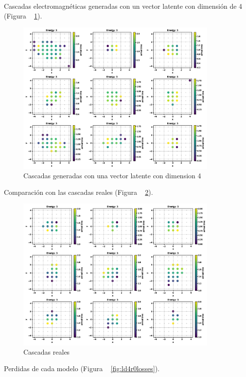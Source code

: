 Cascadas electromagnéticas generadas con un vector latente con dimensión de 4  (Figura ~ \ref{fig:ld4r0fakeshower}).

\begin{figure}
    \centering
    \includegraphics[width=100mm,scale=0.5]{Figures/res/CWGANGP_LD4_R4/fakestep4.png}
    \decoRule
    \caption[Cascadas generadas 1]{
        Cascadas generadas con una vector latente con dimension 4
    }
    \label{fig:ld4r0fakeshower}
\end{figure}

Comparación con las cascadas reales (Figura ~ \ref{fig:ld4r0realshower}).

\begin{figure}
    \centering
    \includegraphics[width=100mm,scale=0.5]{Figures/res/CWGANGP_LD4_R4/realstep4.png}
    \decoRule
    \caption[Cascadas reales 1]{
        Cascadas reales
    }
    \label{fig:ld4r0realshower}
\end{figure}

Perdidas de cada modelo (Figura ~ \ref{fig:ld4r0losses}).

